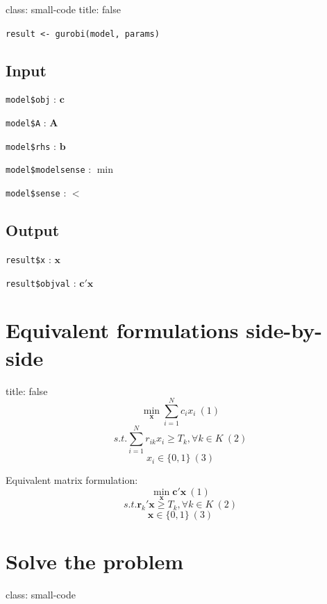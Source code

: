 \documentclass[
]{article}
\begin{document}
class: small-code title: false

\texttt{result\ \textless{}-\ gurobi(model,\ params)}

\hypertarget{input}{%
\subsection{Input}\label{input}}

\texttt{model\$obj} : \(\mathbf{c}\)

\texttt{model\$A} : \(\mathbf{A}\)

\texttt{model\$rhs} : \(\mathbf{b}\)

\texttt{model\$modelsense} : \(\min\)

\texttt{model\$sense} : \(<\)

\hypertarget{output}{%
\subsection{Output}\label{output}}

\texttt{result\$x} : \(\mathbf{x}\)

\texttt{result\$objval} : \(\mathbf{c'x}\)

\hypertarget{equivalent-formulations-side-by-side}{%
\section{Equivalent formulations
side-by-side}\label{equivalent-formulations-side-by-side}}

title: false \[ \min_\mathbf{x} \sum^N_{i=1} c_i x_i \: (1) \]
\[ s.t. \sum_{i=1}^N r_{ik} x_i \geq T_k, \forall k \in K \: (2) \]
\[ x_i \in \{0,1\} \: (3) \]

Equivalent matrix formulation: \[ \min_\mathbf{x} \mathbf{c'x}\: (1) \]
\[ s.t. \mathbf{r}_k' \mathbf{x} \geq T_k, \forall k \in K \: (2) \]
\[ \mathbf{x} \in \{0,1\} \: (3) \]

\hypertarget{solve-the-problem}{%
\section{Solve the problem}\label{solve-the-problem}}

class: small-code
\end{document}
